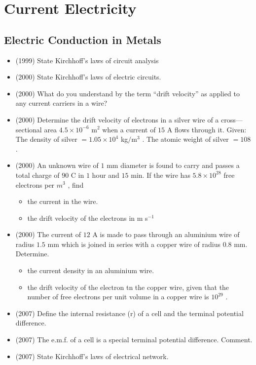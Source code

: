 \documentclass{article}
\begin{document}
\section{Current Electricity}

\subsection{Electric Conduction in Metals}
\begin{itemize}
\item (1999)  State Kirchhoff’s laws of circuit analysis
\item (2000)  State Kirchhoff’s laws of electric circuits.
\item (2000)  What do you understand by the term “drift velocity” as applied to any current carriers in a wire?
\item (2000)  Determine the drift velocity of electrons in a silver wire of a cross—sectional area $ 4.5 \times 10^{-6}$ m$ ^{2}$ when a current of $ 15$ A flows through it. Given: The density of silver $ =1.05 \times 10^{4}$ kg$/$m$ ^{3}$ . The atomic weight of silver $ =108$ .
\item (2000)  An unknown wire of $ 1$ mm diameter is found to carry and passes a total charge of $ 90$ C in $ 1$ hour and $ 15$ min. If the wire has $ 5.8 \times 10^{28}$ free electrons per $ m^{3}$ , find\begin{itemize}
\item  the current in the wire.
\item the drift velocity of the electrons in m s$ ^{-1}$
\end{itemize}
\item (2000)  The current of $ 12$ A is made to pass through an aluminium wire of radius $ 1.5$ mm which is joined in series with a copper wire of radius $ 0.8$ mm. Determine.\begin{itemize}
\item the current density in an aluminium wire.
\item the drift velocity of the electron tn the copper wire, given that the number of free electrons per unit volume in a copper wire is $ 10^{29}$ .
\end{itemize}
\item (2007)  Define the internal resistance (r) of a cell and the terminal potential difference.
\item (2007)  The e.m.f. of a cell is a special terminal potential difference.  Comment.
\item (2007)  State Kirchhoff's laws of electrical network.

\end{itemize}
\end{document}

